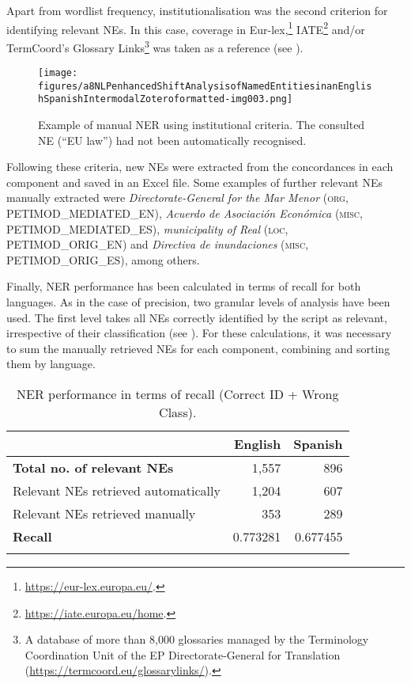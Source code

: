 \documentclass[output=paper]{langscibook}
\begin{document}
Apart from wordlist frequency, institutionalisation was the second criterion for identifying relevant NEs. In this case, coverage in Eur-lex,\footnote{\url{https://eur-lex.europa.eu/}.}  IATE\footnote{\url{https://iate.europa.eu/home}.}  and/or TermCoord’s Glossary Links\footnote{A database of more than 8,000 glossaries managed by the Terminology Coordination Unit of the EP Directorate-General for Translation (\url{https://termcoord.eu/glossarylinks/}).}  was taken as a reference (see ).

\begin{figure} 
\texttt{[image: figures/a8NLPenhancedShiftAnalysisofNamedEntitiesinanEnglishSpanishIntermodalZoteroformatted-img003.png]}

\caption{Example of manual NER using institutional criteria. The consulted NE (“EU law”) had not been automatically recognised.}
\label{fig:corpas:3}
\end{figure}

Following these criteria, new NEs were extracted from the concordances in each component and saved in an Excel file. Some examples of further relevant NEs manually extracted were \textit{Directorate-General for the Mar Menor} (\textsc{org}, PETIMOD\_MEDIATED\_EN), \textit{Acuerdo de Asociación Económica} (\textsc{misc}, PETIMOD\_MEDIATED\_ES), \textit{municipality of Real} (\textsc{loc}, PETIMOD\_ORIG\_EN) and \textit{Directiva de inundaciones} (\textsc{misc}, PETIMOD\_ORIG\_ES), among others. 

Finally, NER performance has been calculated in terms of recall for both languages. As in the case of precision, two granular levels of analysis have been used. The first level takes all NEs correctly identified by the script as relevant, irrespective of their classification (see ). For these calculations, it was necessary to sum the manually retrieved NEs for each component, combining and sorting them by language.

\begin{table}
\begin{tabularx}{\textwidth}{Qrr} 
\lsptoprule
& {\bfseries English} & {\bfseries Spanish}\\
\midrule
{\bfseries Total no. of relevant NEs} & 1,557 & 896\\
Relevant NEs retrieved automatically & 1,204 & 607\\
Relevant NEs retrieved manually & 353 & 289\\
{\bfseries Recall} & 0.773281 & 0.677455\\
\lspbottomrule
\end{tabularx}
\caption{
NER performance in terms of recall (Correct ID + Wrong Class).
}
\label{tab:corpas:6}
\end{table}
\end{document}
